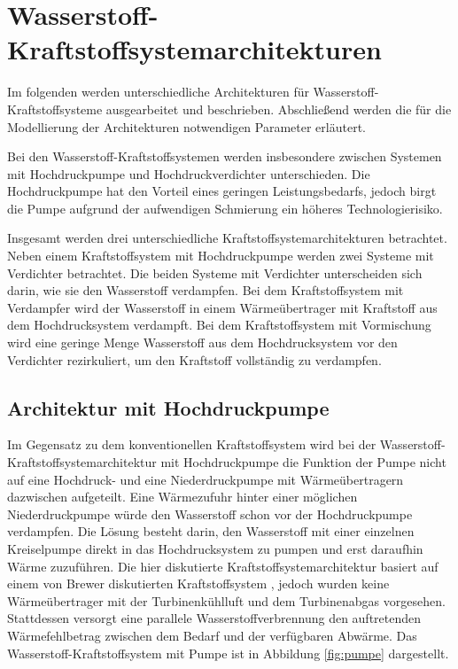 \section{Wasserstoff-Kraftstoffsystemarchitekturen}

Im folgenden werden unterschiedliche Architekturen für Wasserstoff-Kraftstoffsysteme ausgearbeitet und beschrieben. Abschließend werden die für die Modellierung der Architekturen notwendigen Parameter erläutert. 

Bei den Wasserstoff-Kraftstoffsystemen werden insbesondere zwischen Systemen mit Hochdruckpumpe und Hochdruckverdichter unterschieden. Die Hochdruckpumpe hat den Vorteil eines geringen Leistungsbedarfs, jedoch birgt die Pumpe aufgrund der aufwendigen Schmierung ein höheres Technologierisiko. 

Insgesamt werden drei unterschiedliche Kraftstoffsystemarchitekturen betrachtet. Neben einem Kraftstoffsystem mit Hochdruckpumpe werden zwei Systeme mit Verdichter betrachtet. Die beiden Systeme mit Verdichter unterscheiden sich darin, wie sie den Wasserstoff verdampfen. Bei dem Kraftstoffsystem mit Verdampfer wird der Wasserstoff in einem Wärmeübertrager mit Kraftstoff aus dem Hochdrucksystem verdampft. Bei dem Kraftstoffsystem mit Vormischung wird eine geringe Menge Wasserstoff aus dem Hochdrucksystem vor den Verdichter rezirkuliert, um den Kraftstoff vollständig zu verdampfen.

\subsection{Architektur mit Hochdruckpumpe}

Im Gegensatz zu dem konventionellen Kraftstoffsystem wird bei der Wasserstoff-Kraftstoffsystemarchitektur mit Hochdruckpumpe die Funktion der Pumpe nicht auf eine Hochdruck- und eine Niederdruckpumpe mit Wärmeübertragern dazwischen aufgeteilt. Eine Wärmezufuhr hinter einer möglichen Niederdruckpumpe würde den Wasserstoff schon vor der Hochdruckpumpe verdampfen. Die Lösung besteht darin, den Wasserstoff mit einer einzelnen Kreiselpumpe direkt in das Hochdrucksystem zu pumpen und erst daraufhin Wärme zuzuführen. Die hier diskutierte Kraftstoffsystemarchitektur basiert auf einem von Brewer diskutierten Kraftstoffsystem \cite{Brewer.1991}, jedoch wurden keine Wärmeübertrager mit der Turbinenkühlluft und dem Turbinenabgas vorgesehen. Stattdessen versorgt eine parallele Wasserstoffverbrennung den auftretenden Wärmefehlbetrag zwischen dem Bedarf und der verfügbaren Abwärme. Das Wasserstoff-Kraftstoffsystem mit Pumpe ist in  Abbildung \ref{fig:pumpe} dargestellt.

